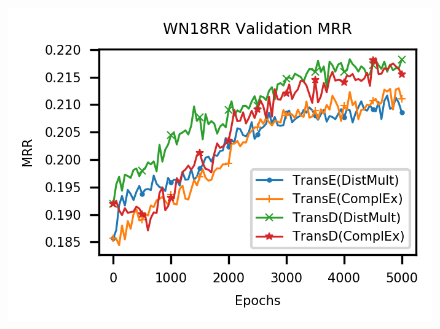 \begin{figure}
\begin{minipage}{.3\textwidth}
    \end{minipage}
    \begin{minipage}{.3\textwidth}
      \centering
      \includegraphics[width=\linewidth]{appendices/figures/original_results/WN18RR_MRR.png}
    \end{minipage}\\
    

\end{figure}
